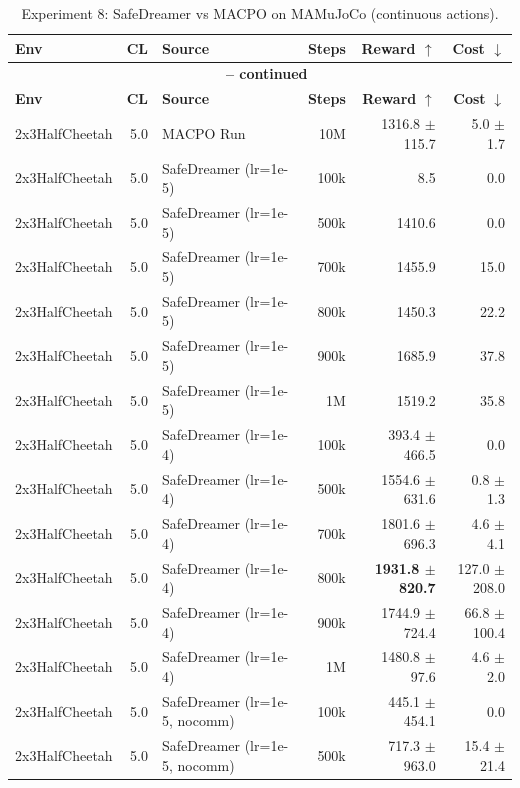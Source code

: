 \documentclass{article}
\begin{document}
\begin{longtable}{l r l r r r}
\caption{Experiment 8: SafeDreamer vs MACPO on MAMuJoCo (continuous actions).}
\label{tab:mamujoco_experiment8} \\
\toprule
\textbf{Env} & \textbf{CL} & \textbf{Source} & \textbf{Steps} & \multicolumn{1}{r}{\textbf{Reward} $\uparrow$} & \multicolumn{1}{r}{\textbf{Cost} $\downarrow$} \\
\midrule
\endfirsthead
\multicolumn{6}{c}{{\bfseries \tablename\ \thetable{} -- continued}} \\
\toprule
\textbf{Env} & \textbf{CL} & \textbf{Source} & \textbf{Steps} & \multicolumn{1}{r}{\textbf{Reward} $\uparrow$} & \multicolumn{1}{r}{\textbf{Cost} $\downarrow$} \\
\midrule
\endhead
\bottomrule
\endlastfoot
2x3HalfCheetah & 5.0 & MACPO Run & 10M & 1316.8 $\pm$ 115.7 & 5.0 $\pm$ 1.7 \\
2x3HalfCheetah & 5.0 & SafeDreamer (lr=1e-5) & 100k & 8.5 & 0.0 \\
2x3HalfCheetah & 5.0 & SafeDreamer (lr=1e-5) & 500k & 1410.6 & 0.0 \\
2x3HalfCheetah & 5.0 & SafeDreamer (lr=1e-5) & 700k & 1455.9 & 15.0 \\
2x3HalfCheetah & 5.0 & SafeDreamer (lr=1e-5) & 800k & 1450.3 & 22.2 \\
2x3HalfCheetah & 5.0 & SafeDreamer (lr=1e-5) & 900k & 1685.9 & 37.8 \\
2x3HalfCheetah & 5.0 & SafeDreamer (lr=1e-5) & 1M & 1519.2 & 35.8 \\
2x3HalfCheetah & 5.0 & SafeDreamer (lr=1e-4) & 100k & 393.4 $\pm$ 466.5 & 0.0 \\
2x3HalfCheetah & 5.0 & SafeDreamer (lr=1e-4) & 500k & 1554.6 $\pm$ 631.6 & 0.8 $\pm$ 1.3 \\
2x3HalfCheetah & 5.0 & SafeDreamer (lr=1e-4) & 700k & 1801.6 $\pm$ 696.3 & 4.6 $\pm$ 4.1 \\
2x3HalfCheetah & 5.0 & SafeDreamer (lr=1e-4) & 800k & \textbf{1931.8 $\pm$ 820.7} & 127.0 $\pm$ 208.0 \\
2x3HalfCheetah & 5.0 & SafeDreamer (lr=1e-4) & 900k & 1744.9 $\pm$ 724.4 & 66.8 $\pm$ 100.4 \\
2x3HalfCheetah & 5.0 & SafeDreamer (lr=1e-4) & 1M & 1480.8 $\pm$ 97.6 & 4.6 $\pm$ 2.0 \\
2x3HalfCheetah & 5.0 & SafeDreamer (lr=1e-5, nocomm) & 100k & 445.1 $\pm$ 454.1 & 0.0 \\
2x3HalfCheetah & 5.0 & SafeDreamer (lr=1e-5, nocomm) & 500k & 717.3 $\pm$ 963.0 & 15.4 $\pm$ 21.4 \\

\end{longtable}
\end{document}
